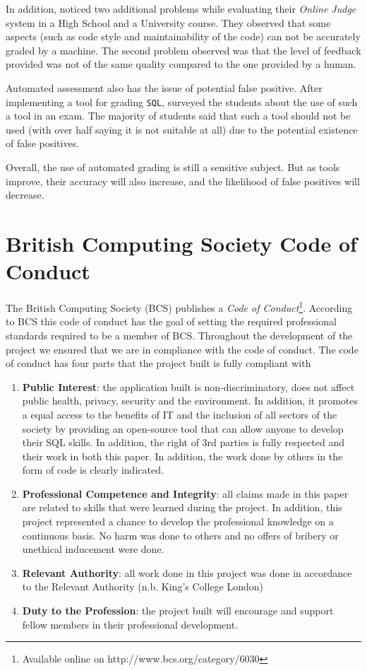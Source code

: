 In addition, \cite{literature:assesment:automated:brenda} noticed two additional problems while evaluating their \textit{Online Judge} system in a High School and a University course. They observed that some aspects (such as code style and maintainability of the code) can not be accurately graded by a machine. The second problem observed was that the level of feedback provided was not of the same quality compared to the one provided by a human.

Automated assessment also has the issue of potential false positive. After implementing a tool for grading \texttt{SQL}, \cite{literature:asqlg} surveyed the students about the use of such a tool in an exam. The majority of students said that such a tool should not be used (with over half saying it is not suitable at all) due to the potential existence of false positives.

Overall, the use of automated grading is still a sensitive subject. But as tools improve, their accuracy will also increase, and the likelihood of false positives will decrease.

\section{British Computing Society Code of Conduct}

The British Computing Society (BCS) publishes a \textit{Code of Conduct}\footnote{Available online on http://www.bcs.org/category/6030}. According to BCS this code of conduct has the goal of setting the required professional standards required to be a member of BCS. Throughout the development of the project we ensured that we are in compliance with the code of conduct. The code of conduct has four parts that the project built is fully compliant with

\begin{enumerate}
    \item \textbf{Public Interest}: the application built is non-discriminatory, does not affect public health, privacy, security and the environment. In addition, it promotes a equal access to the benefits of IT and the inclusion of all sectors of the society by providing an open-source tool that can allow anyone to develop their SQL skills. In addition, the right of 3rd parties is fully respected and their work in both this paper. In addition, the work done by others in the form of code is clearly indicated.
    \item \textbf{Professional Competence and Integrity}: all claims made in this paper are related to skills that were learned during the project. In addition, this project represented a chance to develop the professional knowledge on a continuous basis. No harm was done to others and no offers of bribery or unethical inducement were done.
    \item \textbf{Relevant Authority}: all work done in this project was done in accordance to the Relevant Authority (n.b. King's College London)
    \item \textbf{Duty to the Profession}: the project built will encourage and support fellow members in their professional development.
\end{enumerate}

